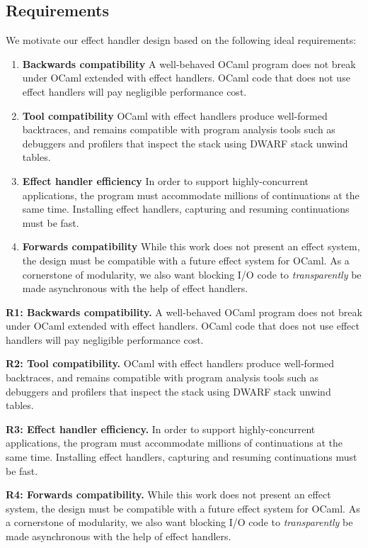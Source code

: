 \documentclass[sigplan,10pt,review,anonymous]{acmart}\settopmatter{printfolios=true,printccs=false,printacmref=false}
\begin{document}
\subsection{Requirements}
\label{sec:req}

We motivate our effect handler design based on the following ideal
requirements:

\begin{enumerate}[label=R\arabic*]
  \item \textbf{Backwards compatibility} A well-behaved OCaml program does not
    break under OCaml extended with effect handlers. OCaml code that does not
    use effect handlers will pay negligible performance cost.
  \item \textbf{Tool compatibility} OCaml with effect handlers produce
    well-formed backtraces, and remains compatible with program analysis tools
    such as debuggers and profilers that inspect the stack using DWARF stack
    unwind tables.
  \item \textbf{Effect handler efficiency} In order to support
    highly-concurrent applications, the program must accommodate millions of
    continuations at the same time. Installing effect handlers, capturing and
    resuming continuations must be fast.
  \item \textbf{Forwards compatibility} While this work does not present an
    effect system, the design must be compatible with a future effect system
    for OCaml. As a cornerstone of modularity, we also want blocking I/O code
    to \emph{transparently} be made asynchronous with the help of effect
    handlers.
\end{enumerate}
\fi

\noindent \textbf{R1: Backwards compatibility.} A well-behaved OCaml program does
not break under OCaml extended with effect handlers. OCaml code that does not
use effect handlers will pay negligible performance cost.

\noindent \textbf{R2: Tool compatibility.} OCaml with effect handlers produce
well-formed backtraces, and remains compatible with program analysis tools such
as debuggers and profilers that inspect the stack using DWARF stack unwind
tables.

\noindent \textbf{R3: Effect handler efficiency.} In order to support
highly-concurrent applications, the program must accommodate millions of
continuations at the same time. Installing effect handlers, capturing and
resuming continuations must be fast.

\noindent \textbf{R4: Forwards compatibility.} While this work does not present an
effect system, the design must be compatible with a future effect system for
OCaml. As a cornerstone of modularity, we also want blocking I/O code to
\emph{transparently} be made asynchronous with the help of effect handlers.
\end{document}
